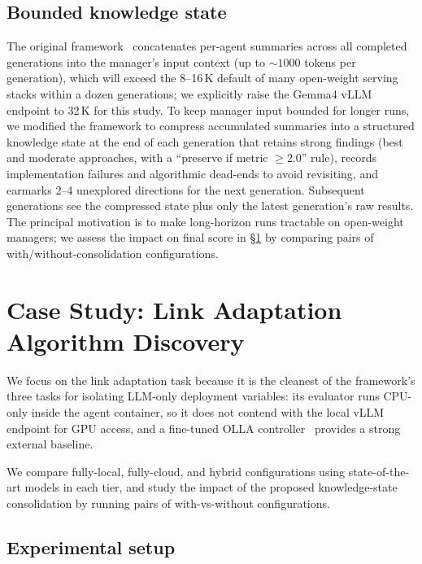 \documentclass[journal]{IEEEtran}
\begin{document}
\subsection{Bounded knowledge state}
\label{sec:consolidation}

The original framework~\cite{aitaoudia2026aite} concatenates per-agent summaries across all completed generations into the manager's input context (up to ${\sim}1000$ tokens per generation), which will exceed the 8--16\,K default of many open-weight serving stacks within a dozen generations; we explicitly raise the Gemma4 vLLM endpoint to 32\,K for this study. To keep manager input bounded for longer runs, we modified the framework to compress accumulated summaries into a structured knowledge state at the end of each generation that retains strong findings (best and moderate approaches, with a ``preserve if metric $\geq 2.0$'' rule), records implementation failures and algorithmic dead-ends to avoid revisiting, and earmarks 2--4 unexplored directions for the next generation. Subsequent generations see the compressed state plus only the latest generation's raw results. The principal motivation is to make long-horizon runs tractable on open-weight managers; we assess the impact on final score in \S\ref{sec:case} by comparing pairs of with/without-consolidation configurations.

\section{Case Study: Link Adaptation Algorithm Discovery}
\label{sec:case}

We focus on the link adaptation task because it is the cleanest of the framework's three tasks for isolating LLM-only deployment variables: its evaluator runs CPU-only inside the agent container, so it does not contend with the local vLLM endpoint for GPU access, and a fine-tuned OLLA controller~\cite{sampath1997olla} provides a strong external baseline.

We compare fully-local, fully-cloud, and hybrid configurations using state-of-the-art models in each tier, and study the impact of the proposed knowledge-state consolidation by running pairs of with-vs-without configurations.




\subsection{Experimental setup}
\end{document}
